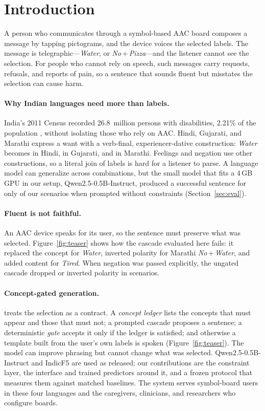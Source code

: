 \section{Introduction}
\label{sec:intro}

A person who communicates through a symbol-based AAC board composes a message by tapping pictograms, and the device voices the selected labels.
The message is telegraphic---\emph{Water}, or \emph{No}\,+\,\emph{Pizza}---and the listener cannot see the selection.
For people who cannot rely on speech, such messages carry requests, refusals, and reports of pain, so a sentence that sounds fluent but misstates the selection can cause harm.

\paragraph{Why Indian languages need more than labels.}
India's 2011 Census recorded 26.8~million persons with disabilities, 2.21\% of the population \citep{census2011}, without isolating those who rely on AAC.
Hindi, Gujarati, and Marathi express a want with a verb-final, experiencer-dative construction: \emph{Water} becomes  in Hindi,  in Gujarati, and  in Marathi.
Feelings and negation use other constructions, so a literal join of labels is hard for a listener to parse.
A language model can generalize across combinations, but the small model that fits a 4\,GB GPU in our setup, Qwen2.5-0.5B-Instruct, produced a successful sentence for only \XNaiveSucc{} of our scenarios when prompted without constraints (Section~\ref{sec:eval}).

\paragraph{Fluent is not faithful.}
An AAC device speaks for its user, so the sentence must preserve what was selected.
Figure~\ref{fig:teaser} shows how the cascade evaluated here fails: it replaced the concept for \emph{Water}, inverted polarity for Marathi \emph{No}\,+\,\emph{Water}, and added content for \emph{Tired}.
When negation was passed explicitly, the ungated cascade dropped or inverted polarity in \XPreSPol{} scenarios.

\paragraph{Concept-gated generation.}
\sys{} treats the selection as a contract.
A \emph{concept ledger} lists the concepts that must appear and those that must not; a prompted cascade proposes a sentence; a deterministic \emph{gate} accepts it only if the ledger is satisfied; and otherwise a template built from the user's own labels is spoken (Figure~\ref{fig:teaser}).
The model can improve phrasing but cannot change what was selected.
Qwen2.5-0.5B-Instruct and IndicF5 are used as released; our contributions are the constraint layer, the interface and trained predictors around it, and a frozen protocol that measures them against matched baselines.
The system serves symbol-board users in these four languages and the caregivers, clinicians, and researchers who configure boards.


